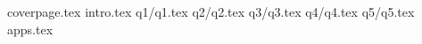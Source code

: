 \documentclass[12pt]{article}
\begin{document}
    {coverpage.tex}
    {intro.tex}
    {q1/q1.tex}
    {q2/q2.tex}
    {q3/q3.tex}
    {q4/q4.tex}
    {q5/q5.tex}
    {apps.tex}


    \pagebreak
    
    
    
\end{document}
